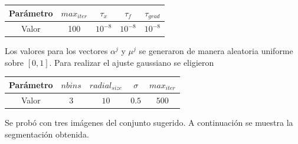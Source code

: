 \documentclass[11pt,letterpaper]{article}
\theoremstyle{definition}
\theoremstyle{definition}
\theoremstyle{definition}
\begin{document}
\begin{center}
	\begin{tabular}{ccccc}
		\hline
		Parámetro & $ max_{iter} $ & $ \tau_x $ & $ \tau_f $ & $ \tau_{grad} $ \\
		\hline
		 Valor    &      100     & $ 10^{-8} $ & $ 10^{-8} $ & $ 10^{-8} $  \\
		\hline
	\end{tabular}
\end{center}
Los valores para los vectores $ \alpha^j $ y $ \mu^j $ se generaron de manera aleatoria uniforme sobre $ [0, 1] $. Para realizar el ajuste gaussiano se eligieron
\begin{center}
	\begin{tabular}{ccccc}
		\hline
		Parámetro & $ nbins $ & $ radial_{size} $ & $ \sigma $ & $ max_{iter} $ \\
		\hline
		Valor    &      $ 3 $    & $ 10 $ & $ 0.5 $ & $ 500 $  \\
		\hline
	\end{tabular}
\end{center}
Se probó con tres imágenes del conjunto sugerido. A continuación se muestra la segmentación obtenida.
\end{document}
